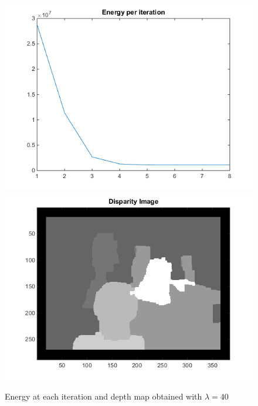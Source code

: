 \documentclass[11pt,a4paper]{article}
\begin{document}
\begin{figure}[H]
	\centering
	\noindent\includegraphics[scale=0.4]{results/energy40.png}
	\noindent\includegraphics[scale=0.4]{results/disparity_est40-7it.png}
	\caption{Energy at each iteration and depth map obtained with $\lambda = 40$}
\end{figure}
\end{document}
